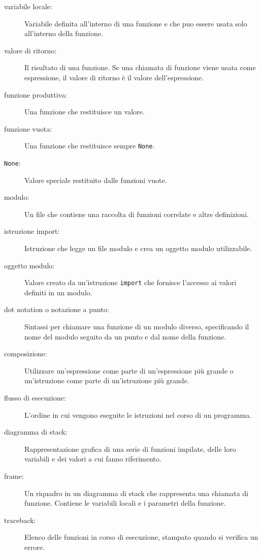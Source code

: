 \documentclass[10pt]{book}
\begin{document}
\begin{description}
\item[variabile locale:]  Variabile definita all'interno di una funzione e che puo essere usata solo all'interno della funzione.

\item[valore di ritorno:]  Il risultato di una funzione. Se una chiamata di funzione viene usata come espressione, il valore di ritorno è il valore dell'espressione.

\item[funzione produttiva:] Una funzione che restituisce un valore.

\item[funzione vuota:] Una funzione che restituisce sempre {\tt None}.

\item[{\tt None}:]  Valore speciale restituito dalle funzioni vuote.

\item[modulo:] Un file che contiene una raccolta di funzioni correlate e altre definizioni.

\item[istruzione import:] Istruzione che legge un file modulo e crea un oggetto modulo utilizzabile.

\item[oggetto modulo:] Valore creato da un'istruzione {\tt import} che fornisce l'accesso ai valori definiti in un modulo.

\item[dot notation o notazione a punto:]  Sintassi per chiamare una funzione di un modulo diverso, specificando il nome del modulo seguito da un punto e dal nome della funzione.

\item[composizione:] Utilizzare un'espressione come parte di un'espressione più grande o un'istruzione come parte di un'istruzione più grande.

\item[flusso di esecuzione:]  L'ordine in cui vengono eseguite le istruzioni nel corso di un programma.

\item[diagramma di stack:]  Rappresentazione grafica di una serie di funzioni impilate, delle loro variabili e dei valori a cui fanno riferimento.

\item[frame:]  Un riquadro in un diagramma di stack che rappresenta una chiamata di funzione. Contiene le variabili locali e i parametri della funzione.

\item[traceback:]  Elenco delle funzioni in corso di esecuzione, stampato quando si verifica un errore.


\end{description}
\end{document}
